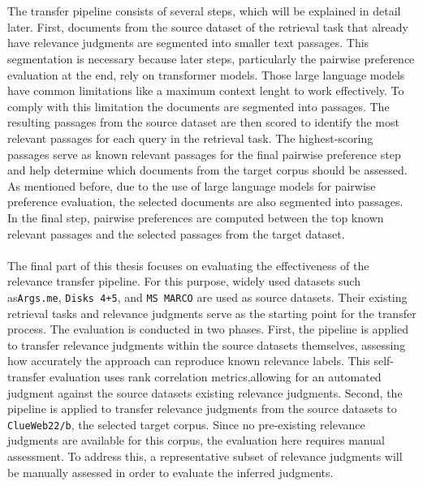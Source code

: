 \\\\
The transfer pipeline consists of several steps, which will be explained in detail later. First, documents from the source dataset of the retrieval task that already have relevance judgments are segmented into smaller text passages. This segmentation is necessary because later steps, particularly the pairwise preference evaluation at the end, rely on transformer models. Those large language models have common limitations like a maximum context lenght to work effectively. To comply with this limitation the documents are segmented into passages. The resulting passages from the source dataset are then scored to identify the most relevant passages for each query in the retrieval task. The highest-scoring passages serve as known relevant passages for the final pairwise preference step and help determine which documents from the target corpus should be assessed. As mentioned before, due to the use of large language models for pairwise preference evaluation, the selected documents are also segmented into passages. In the final step, pairwise preferences are computed between the top known relevant passages and the selected passages from the target dataset.
\\\\
The final part of this thesis focuses on evaluating the effectiveness of the relevance transfer pipeline. For this purpose, widely used datasets such as\texttt{Args.me}, \texttt{Disks 4+5}, and \texttt{MS MARCO} are used  as source datasets. Their existing retrieval tasks and relevance judgments serve as the starting point for the transfer process. The evaluation is conducted in two phases. First, the pipeline is applied to transfer relevance judgments within the source datasets themselves, assessing how accurately the approach can reproduce known relevance labels. This self-transfer evaluation uses rank correlation metrics,allowing for an automated judgment against the source datasets existing relevance judgments. Second, the pipeline is applied to transfer relevance judgments from the source datasets to \texttt{ClueWeb22/b}, the selected target corpus. Since no pre-existing relevance judgments are available for this corpus, the evaluation here requires manual assessment. To address this, a representative subset of relevance judgments will be manually assessed in order to evaluate the inferred judgments.
